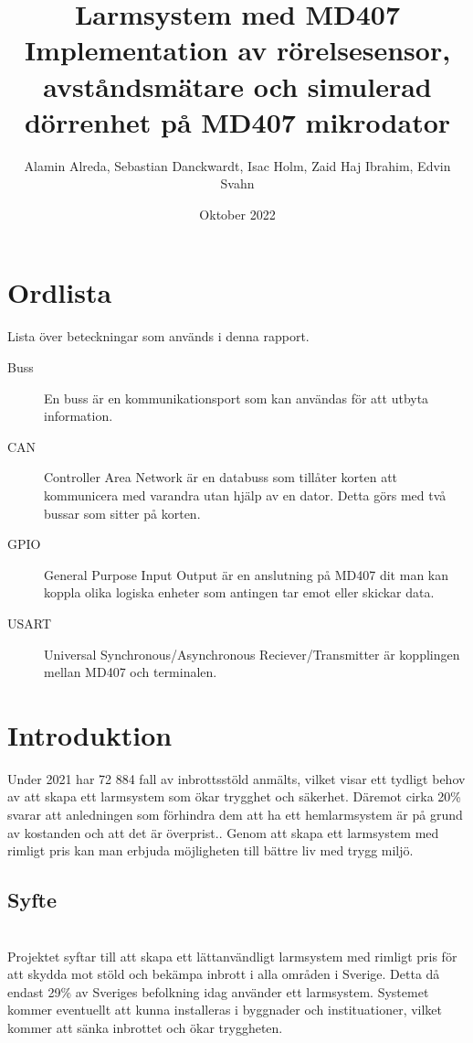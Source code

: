 \documentclass{article}
\title{\textbf{Larmsystem med MD407}\\ 
        \hspace{10cm}
        \small Implementation av rörelsesensor, avståndsmätare och simulerad dörrenhet på MD407 mikrodator}
\author{Alamin Alreda, Sebastian Danckwardt, Isac Holm, Zaid Haj Ibrahim, Edvin Svahn}
\date{Oktober 2022}
\begin{document}
\maketitle
\newpage
\tableofcontents
\newpage
\section*{Ordlista}
Lista över beteckningar som används i denna rapport.
\begin{description}

\item[Buss] En buss är en kommunikationsport som kan användas för att utbyta information.

\item[CAN] Controller Area Network är en databuss som tillåter korten att kommunicera med varandra utan hjälp av en dator. Detta görs med två bussar som sitter på korten.

\item[GPIO] General Purpose Input Output är en anslutning på MD407 dit man kan koppla olika logiska enheter som antingen tar emot eller skickar data.

\item[USART] Universal Synchronous/Asynchronous Reciever/Transmitter är kopplingen mellan MD407 och terminalen.


\end{description}
 \newpage

\setcounter{page}{1}
\section{Introduktion}
Under 2021 har 72 884 fall av inbrottsstöld anmälts, vilket visar ett tydligt behov av att skapa ett larmsystem som ökar trygghet och säkerhet.\cite{BRa} Däremot cirka 20\% svarar att anledningen som förhindra dem att ha ett hemlarmsystem är på grund av kostanden och att det är överprist.\cite{MoFor}.
Genom att skapa ett larmsystem med rimligt pris kan man erbjuda möjligheten till bättre liv med trygg miljö.

\subsection{Syfte}
\\
Projektet syftar till att skapa ett lättanvändligt larmsystem med rimligt pris för att skydda mot stöld och bekämpa inbrott i alla områden i Sverige. Detta då endast 29\% av Sveriges befolkning idag använder ett larmsystem.\cite{SSF} Systemet kommer eventuellt att kunna installeras i byggnader och instituationer, vilket kommer att sänka inbrottet och ökar tryggheten.
\end{document}
